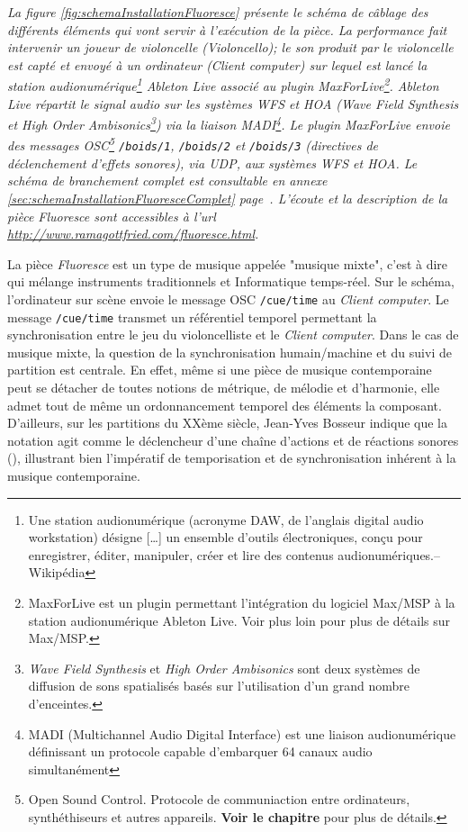 \begin{center}
\small \it La figure \ref{fig:schemaInstallationFluoresce} présente le schéma de câblage des différents éléments qui vont servir à l'exécution de la pièce. La performance fait intervenir un joueur de violoncelle (\textit{Violoncello}); le son produit par le violoncelle est capté et envoyé à un ordinateur (\textit{Client computer}) sur lequel est lancé la station audionumérique\footnote{\og Une station audionumérique (acronyme DAW, de l'anglais digital audio workstation) désigne […] un ensemble d'outils électroniques, conçu pour enregistrer, éditer, manipuler, créer et lire des contenus audionumériques.\fg -- Wikipédia} \textit{Ableton Live} associé au plugin \textit{MaxForLive}\footnote{MaxForLive est un plugin permettant l'intégration du logiciel Max/MSP à la station audionumérique Ableton Live. Voir plus loin pour plus de détails sur Max/MSP.}. Ableton Live répartit le signal audio sur les systèmes WFS et HOA (\textit{Wave Field Synthesis} et \textit{High Order Ambisonics}\footnote{\textit{Wave Field Synthesis} et \textit{High Order Ambisonics} sont deux systèmes de diffusion de sons spatialisés basés sur l'utilisation d'un grand nombre d'enceintes.}) via la liaison MADI\footnote{MADI (Multichannel Audio Digital Interface) est une liaison audionumérique définissant un protocole capable d'embarquer 64 canaux audio simultanément}. Le plugin MaxForLive envoie des messages OSC\footnote{Open Sound Control. Protocole de communiaction entre ordinateurs, synthéthiseurs et autres appareils. \textbf{Voir le chapitre} pour plus de détails.} \texttt{/boids/1}, \texttt{/boids/2} et \texttt{/boids/3} (directives de déclenchement d'effets sonores), via UDP, aux systèmes WFS et HOA. Le schéma de branchement complet est consultable en annexe \ref{sec:schemaInstallationFluoresceComplet} page~\pageref{sec:schemaInstallationFluoresceComplet}. L'écoute et la description de la pièce \textit{Fluoresce} sont accessibles à l'url \url{http://www.ramagottfried.com/fluoresce.html}.
\end{center}

La pièce \textit{Fluoresce} est un type de musique appelée "musique mixte", c'est à dire qui mélange instruments traditionnels et Informatique temps-réel.
Sur le schéma, l'ordinateur sur scène envoie le message OSC \texttt{/cue/time} au \textit{Client computer}. Le message \texttt{/cue/time} transmet un référentiel temporel permettant la synchronisation entre le jeu du violoncelliste et le \textit{Client computer}. 
Dans le cas de musique mixte, la question de la synchronisation humain/machine et du suivi de partition est centrale. 
En effet, même si une pièce de musique contemporaine peut se détacher de toutes notions de métrique, de mélodie et d'harmonie, elle admet tout de même un ordonnancement temporel des éléments la composant.
D'ailleurs, sur les partitions du XXème siècle, Jean-Yves Bosseur indique que la notation agit comme le \og déclencheur d'une chaîne d'actions et de réactions sonores \fg (\cite[121]{bosseur2005}), illustrant bien l'impératif de temporisation et de synchronisation inhérent à la musique contemporaine.
